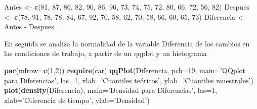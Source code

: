 \documentclass[10pt,]{krantz}
\makeatletter
\newenvironment{Shaded}{\begin{snugshade}}{\end{snugshade}}
\newcommand{\KeywordTok}[1]{\textcolor[rgb]{0.13,0.29,0.53}{\textbf{{#1}}}}
\newcommand{\DataTypeTok}[1]{\textcolor[rgb]{0.13,0.29,0.53}{{#1}}}
\newcommand{\DecValTok}[1]{\textcolor[rgb]{0.00,0.00,0.81}{{#1}}}
\newcommand{\StringTok}[1]{\textcolor[rgb]{0.31,0.60,0.02}{{#1}}}
\newcommand{\NormalTok}[1]{{#1}}
\newenvironment{kframe}{%
\medskip{}
\setlength{\fboxsep}{.8em}
 \def\at@end@of@kframe{}%
 \ifinner\ifhmode%
  \def\at@end@of@kframe{\end{minipage}}%
  \begin{minipage}{\columnwidth}%
 \fi\fi%
 \def\FrameCommand##1{\hskip\@totalleftmargin \hskip-\fboxsep
 \colorbox{shadecolor}{##1}\hskip-\fboxsep
     \hskip-\linewidth \hskip-\@totalleftmargin \hskip\columnwidth}%
 \MakeFramed {\advance\hsize-\width
   \@totalleftmargin\z@ \linewidth\hsize
   \@setminipage}}%
 {\par\unskip\endMakeFramed%
 \at@end@of@kframe}
\renewenvironment{Shaded}{\begin{kframe}}{\end{kframe}}
\makeatother
\begin{document}
\begin{Shaded}
\begin{Highlighting}[]
\NormalTok{Antes   <-}\StringTok{ }\KeywordTok{c}\NormalTok{(}\DecValTok{81}\NormalTok{, }\DecValTok{87}\NormalTok{, }\DecValTok{86}\NormalTok{, }\DecValTok{82}\NormalTok{, }\DecValTok{90}\NormalTok{, }\DecValTok{86}\NormalTok{, }\DecValTok{96}\NormalTok{, }\DecValTok{73}\NormalTok{,}
             \DecValTok{74}\NormalTok{, }\DecValTok{75}\NormalTok{, }\DecValTok{72}\NormalTok{, }\DecValTok{80}\NormalTok{, }\DecValTok{66}\NormalTok{, }\DecValTok{72}\NormalTok{, }\DecValTok{56}\NormalTok{, }\DecValTok{82}\NormalTok{)}
\NormalTok{Despues <-}\StringTok{ }\KeywordTok{c}\NormalTok{(}\DecValTok{78}\NormalTok{, }\DecValTok{91}\NormalTok{, }\DecValTok{78}\NormalTok{, }\DecValTok{78}\NormalTok{, }\DecValTok{84}\NormalTok{, }\DecValTok{67}\NormalTok{, }\DecValTok{92}\NormalTok{, }\DecValTok{70}\NormalTok{,}
             \DecValTok{58}\NormalTok{, }\DecValTok{62}\NormalTok{, }\DecValTok{70}\NormalTok{, }\DecValTok{58}\NormalTok{, }\DecValTok{66}\NormalTok{, }\DecValTok{60}\NormalTok{, }\DecValTok{65}\NormalTok{, }\DecValTok{73}\NormalTok{)}
\NormalTok{Diferencia <-}\StringTok{ }\NormalTok{Antes -}\StringTok{ }\NormalTok{Despues}
\end{Highlighting}
\end{Shaded}

En seguida se analiza la normalidad de la variable Diferencia de los
cambios en las condiciones de trabajo, a partir de un qqplot y un
histograma

\begin{Shaded}
\begin{Highlighting}[]
\KeywordTok{par}\NormalTok{(}\DataTypeTok{mfrow=}\KeywordTok{c}\NormalTok{(}\DecValTok{1}\NormalTok{,}\DecValTok{2}\NormalTok{))}
\KeywordTok{require}\NormalTok{(car)}
\KeywordTok{qqPlot}\NormalTok{(Diferencia, }\DataTypeTok{pch=}\DecValTok{19}\NormalTok{, }\DataTypeTok{main=}\StringTok{'QQplot para Diferencias'}\NormalTok{, }\DataTypeTok{las=}\DecValTok{1}\NormalTok{, }
       \DataTypeTok{xlab=}\StringTok{'Cuantiles teóricos'}\NormalTok{, }\DataTypeTok{ylab=}\StringTok{'Cuantiles muestrales'}\NormalTok{)}
\KeywordTok{plot}\NormalTok{(}\KeywordTok{density}\NormalTok{(Diferencia), }\DataTypeTok{main=}\StringTok{'Densidad para Diferencias'}\NormalTok{, }\DataTypeTok{las=}\DecValTok{1}\NormalTok{,}
     \DataTypeTok{xlab=}\StringTok{'Diferencia de tiempo'}\NormalTok{, }\DataTypeTok{ylab=}\StringTok{'Densidad'}\NormalTok{)}
\end{Highlighting}
\end{Shaded}
\end{document}
